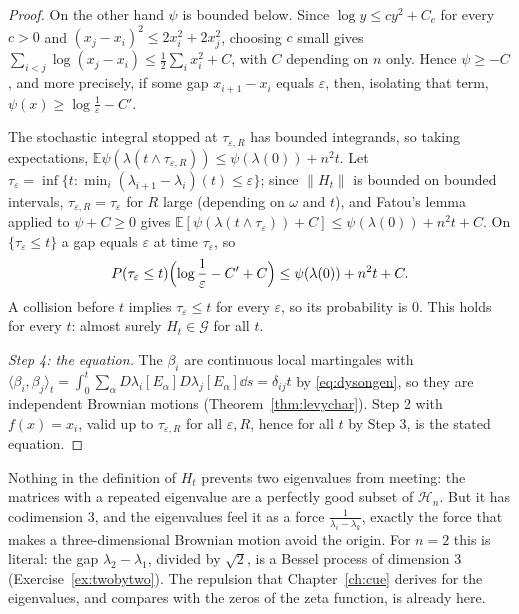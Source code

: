\begin{proof}
On the other hand $\psi$ is bounded below. Since $\log y\le cy^2+C_c$ for every $c>0$ and $(x_j-x_i)^2\le2x_i^2+2x_j^2$, choosing $c$ small gives $\sum_{i<j}\log(x_j-x_i)\le\frac12\sum_ix_i^2+C$, with $C$ depending on $n$ only.
Hence $\psi\ge-C$, and more precisely, if some gap $x_{i+1}-x_i$ equals $\varepsilon$, then, isolating that term, $\psi(x)\ge\log\frac1\varepsilon-C'$.

The stochastic integral stopped at $\tau_{\varepsilon,R}$ has bounded integrands, so taking expectations,
$\mathbb E\psi(\lambda(t\wedge\tau_{\varepsilon,R}))\le\psi(\lambda(0))+n^2t$. Let $\tau_\varepsilon=\inf\{t:\min_i(\lambda_{i+1}-\lambda_i)(t)\le\varepsilon\}$; since $\|H_t\|$ is bounded on bounded intervals, $\tau_{\varepsilon,R}=\tau_\varepsilon$ for $R$
large (depending on $\omega$ and $t$), and Fatou's lemma applied to $\psi+C\ge0$ gives $\mathbb E[\psi(\lambda(t\wedge\tau_\varepsilon))+C]\le\psi(\lambda(0))+n^2t+C$. On $\{\tau_\varepsilon\le t\}$ a gap equals $\varepsilon$ at time $\tau_\varepsilon$, so
\[
P(\tau_\varepsilon\le t)\Bigl(\log\frac1\varepsilon-C'+C\Bigr)\le\psi(\lambda(0))+n^2t+C.
\]
A collision before $t$ implies $\tau_\varepsilon\le t$ for every $\varepsilon$, so its probability is $0$. This holds for every $t$: almost surely $H_t\in\mathcal G$ for all $t$.

\emph{Step 4: the equation.} The $\beta_i$ are continuous local martingales with $\langle\beta_i,\beta_j\rangle_t=\int_0^t\sum_\alpha D\lambda_i[E_\alpha]D\lambda_j[E_\alpha]\dd s=\delta_{ij}t$ by \eqref{eq:dysongen}, so they are independent
Brownian motions (Theorem~\ref{thm:levychar}). Step 2 with $f(x)=x_i$, valid up to $\tau_{\varepsilon,R}$ for all $\varepsilon,R$, hence for all $t$ by Step 3, is the stated equation.
\end{proof}

\begin{beauty}
Nothing in the definition of $H_t$ prevents two eigenvalues from meeting: the matrices with a repeated eigenvalue are a perfectly good subset of $\mathcal H_n$. But it has codimension $3$, and the
eigenvalues feel it as a force $\frac1{\lambda_i-\lambda_k}$, exactly the force that makes a three-dimensional Brownian motion avoid the origin. For $n=2$ this is literal: the gap
$\lambda_2-\lambda_1$, divided by $\sqrt2$, is a Bessel process of dimension $3$ (Exercise~\ref{ex:twobytwo}). The repulsion that Chapter~\ref{ch:cue} derives for the eigenvalues, and compares with the zeros of the zeta function, is already here.
\end{beauty}

